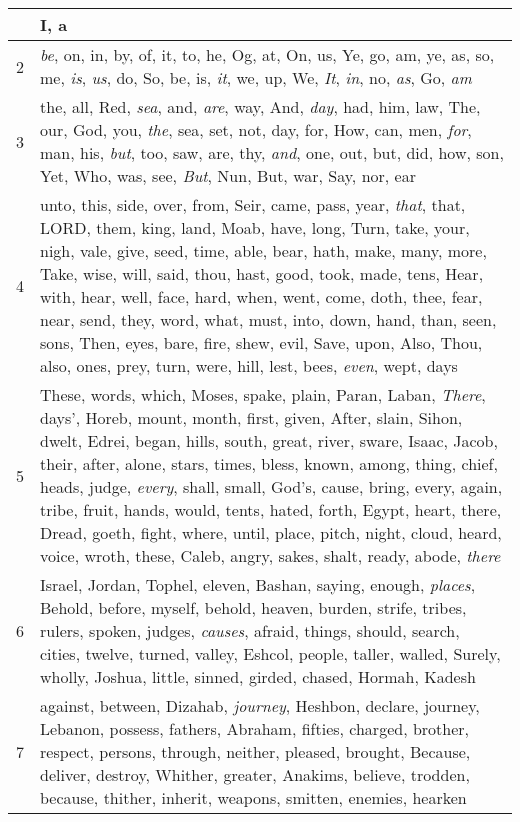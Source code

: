 \begin{longtable}{l|p{3.75in}}
\hline \hline
\endlastfoot
1 & I, a \\ \hline
2 & \emph{be}, on, in, by, of, it, to, he, Og, at, On, us, Ye, go, am, ye, as, so, me, \emph{is}, \emph{us}, do, So, be, is, \emph{it}, we, up, We, \emph{It}, \emph{in}, no, \emph{as}, Go, \emph{am} \\ \hline
3 & the, all, Red, \emph{sea}, and, \emph{are}, way, And, \emph{day}, had, him, law, The, our, God, you, \emph{the}, sea, set, not, day, for, How, can, men, \emph{for}, man, his, \emph{but}, too, saw, are, thy, \emph{and}, one, out, but, did, how, son, Yet, Who, was, see, \emph{But}, Nun, But, war, Say, nor, ear \\ \hline
4 & unto, this, side, over, from, Seir, came, pass, year, \emph{that}, that, LORD, them, king, land, Moab, have, long, Turn, take, your, nigh, vale, give, seed, time, able, bear, hath, make, many, more, Take, wise, will, said, thou, hast, good, took, made, tens, Hear, with, hear, well, face, hard, when, went, come, doth, thee, fear, near, send, they, word, what, must, into, down, hand, than, seen, sons, Then, eyes, bare, fire, shew, evil, Save, upon, Also, Thou, also, ones, prey, turn, were, hill, lest, bees, \emph{even}, wept, days \\ \hline
5 & These, words, which, Moses, spake, plain, Paran, Laban, \emph{There}, days', Horeb, mount, month, first, given, After, slain, Sihon, dwelt, Edrei, began, hills, south, great, river, sware, Isaac, Jacob, their, after, alone, stars, times, bless, known, among, thing, chief, heads, judge, \emph{every}, shall, small, God's, cause, bring, every, again, tribe, fruit, hands, would, tents, hated, forth, Egypt, heart, there, Dread, goeth, fight, where, until, place, pitch, night, cloud, heard, voice, wroth, these, Caleb, angry, sakes, shalt, ready, abode, \emph{there} \\ \hline
6 & Israel, Jordan, Tophel, eleven, Bashan, saying, enough, \emph{places}, Behold, before, myself, behold, heaven, burden, strife, tribes, rulers, spoken, judges, \emph{causes}, afraid, things, should, search, cities, twelve, turned, valley, Eshcol, people, taller, walled, Surely, wholly, Joshua, little, sinned, girded, chased, Hormah, Kadesh \\ \hline
7 & against, between, Dizahab, \emph{journey}, Heshbon, declare, journey, Lebanon, possess, fathers, Abraham, fifties, charged, brother, respect, persons, through, neither, pleased, brought, Because, deliver, destroy, Whither, greater, Anakims, believe, trodden, because, thither, inherit, weapons, smitten, enemies, hearken \\ \hline

\end{longtable}
